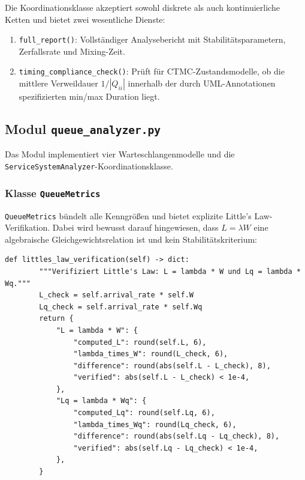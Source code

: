 ﻿\documentclass[a4paper,12pt]{scrreprt}
\theoremstyle{definition}
\begin{document}
Die Koordinationsklasse akzeptiert sowohl diskrete als auch kontinuierliche
Ketten und bietet zwei wesentliche Dienste:

\begin{enumerate}
	\item[-] \texttt{full\_report()}: Vollständiger Analysebericht mit
	Stabilitätsparametern, Zerfallsrate und Mixing-Zeit.
	\item[-] \texttt{timing\_compliance\_check()}: Prüft für CTMC-Zustandsmodelle,
	ob die mittlere Verweildauer $1/|Q_{ii}|$ innerhalb der durch
	UML-Annotationen spezifizierten min/max Duration liegt.
\end{enumerate}

\subsection{Modul \texttt{queue\_analyzer.py}}
\label{sec:queue-analyzer-impl}

Das Modul implementiert vier Warteschlangenmodelle und die
\texttt{ServiceSystemAnaly\newline zer}-Koordinationsklasse.

\subsubsection{Klasse \texttt{QueueMetrics}}

\texttt{QueueMetrics} bündelt alle Kenngrößen und bietet explizite
Little's Law-Verifikation. Dabei wird bewusst darauf hingewiesen, dass
$L = \lambda W$ eine algebraische Gleichgewichtsrelation ist und kein
Stabilitätskriterium:

\begin{lstlisting}[style=python, caption={Little's Law Verifikation mit theoretischem Hinweis}, label=lst:littles-law-impl]
def littles_law_verification(self) -> dict:
        """Verifiziert Little's Law: L = lambda * W und Lq = lambda * Wq."""
        L_check = self.arrival_rate * self.W
        Lq_check = self.arrival_rate * self.Wq
        return {
            "L = lambda * W": {
                "computed_L": round(self.L, 6),
                "lambda_times_W": round(L_check, 6),
                "difference": round(abs(self.L - L_check), 8),
                "verified": abs(self.L - L_check) < 1e-4,
            },
            "Lq = lambda * Wq": {
                "computed_Lq": round(self.Lq, 6),
                "lambda_times_Wq": round(Lq_check, 6),
                "difference": round(abs(self.Lq - Lq_check), 8),
                "verified": abs(self.Lq - Lq_check) < 1e-4,
            },
        }
\end{lstlisting}
\end{document}
